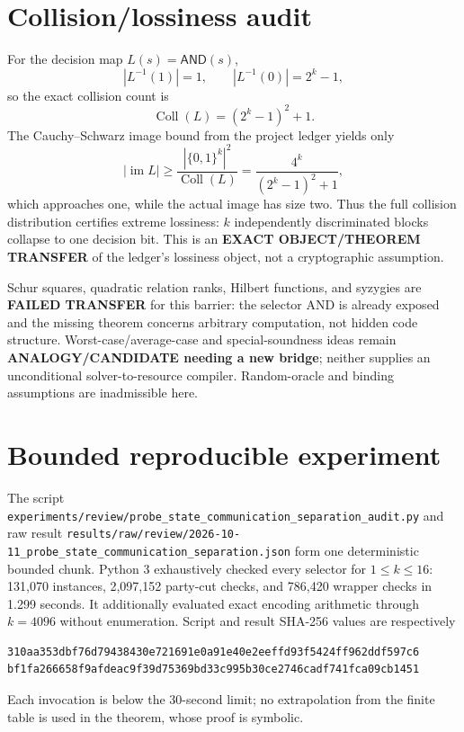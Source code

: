 \documentclass[11pt]{article}
\newcommand{\AND}{\mathsf{AND}}
\begin{document}
\section{Collision/lossiness audit}

For the decision map $L(s)=\AND(s)$,
\[
 |L^{-1}(1)|=1,\qquad |L^{-1}(0)|=2^k-1,
\]
so the exact collision count is
\[
 \operatorname{Coll}(L)=(2^k-1)^2+1.
\]
The Cauchy--Schwarz image bound from the project ledger yields only
\[
 |\operatorname{im}L|\ge
 \frac{|\{0,1\}^k|^2}{\operatorname{Coll}(L)}
 =\frac{4^k}{(2^k-1)^2+1},
\]
which approaches one, while the actual image has size two.  Thus the full
collision distribution certifies extreme lossiness: $k$ independently
discriminated blocks collapse to one decision bit.  This is an
\textbf{EXACT OBJECT/THEOREM TRANSFER} of the ledger's lossiness object, not a
cryptographic assumption.

Schur squares, quadratic relation ranks, Hilbert functions, and syzygies are
\textbf{FAILED TRANSFER} for this barrier: the selector AND is already exposed
and the missing theorem concerns arbitrary computation, not hidden code
structure.  Worst-case/average-case and special-soundness ideas remain
\textbf{ANALOGY/CANDIDATE needing a new bridge}; neither supplies an
unconditional solver-to-resource compiler.  Random-oracle and binding
assumptions are inadmissible here.

\section{Bounded reproducible experiment}

The script
\texttt{experiments/review/probe\_state\_communication\_separation\_audit.py}
and raw result
\texttt{results/raw/review/2026-10-11\_probe\_state\_communication\_separation.json}
form one deterministic bounded chunk.  Python 3 exhaustively checked every
selector for $1\le k\le16$: 131,070 instances, 2,097,152 party-cut checks,
and 786,420 wrapper checks in 1.299 seconds.  It additionally evaluated exact
encoding arithmetic through $k=4096$ without enumeration.  Script and result
SHA-256 values are respectively
\begin{verbatim}
310aa353dbf76d79438430e721691e0a91e40e2eeffd93f5424ff962ddf597c6
bf1fa266658f9afdeac9f39d75369bd33c995b30ce2746cadf741fca09cb1451
\end{verbatim}
Each invocation is below the 30-second limit; no extrapolation from the finite
table is used in the theorem, whose proof is symbolic.
\end{document}
